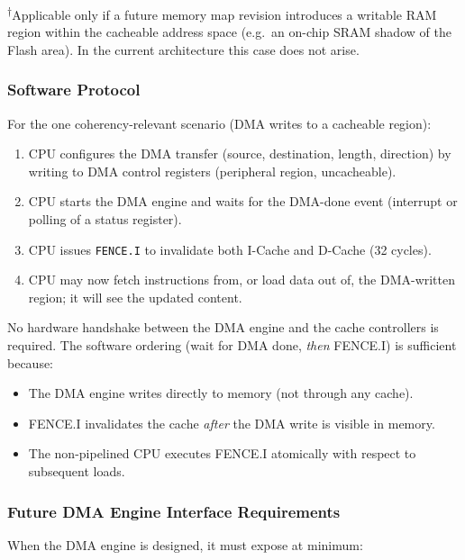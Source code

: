 \textsuperscript{$\dagger$}Applicable only if a future memory map revision
introduces a writable RAM region within the cacheable address space
(e.g.\ an on-chip SRAM shadow of the Flash area).
In the current architecture this case does not arise.

\subsubsection{Software Protocol}

For the one coherency-relevant scenario (DMA writes to a cacheable region):

\begin{enumerate}
  \item CPU configures the DMA transfer (source, destination, length,
    direction) by writing to DMA control registers (peripheral region,
    uncacheable).
  \item CPU starts the DMA engine and waits for the DMA-done event
    (interrupt or polling of a status register).
  \item CPU issues \texttt{FENCE.I} to invalidate both I-Cache and
    D-Cache (32 cycles).
  \item CPU may now fetch instructions from, or load data out of,
    the DMA-written region; it will see the updated content.
\end{enumerate}

No hardware handshake between the DMA engine and the cache controllers
is required.
The software ordering (wait for DMA done, \emph{then} FENCE.I) is
sufficient because:

\begin{itemize}
  \item The DMA engine writes directly to memory (not through any cache).
  \item FENCE.I invalidates the cache \emph{after} the DMA write is
    visible in memory.
  \item The non-pipelined CPU executes FENCE.I atomically with respect
    to subsequent loads.
\end{itemize}

\subsubsection{Future DMA Engine Interface Requirements}

When the DMA engine is designed, it must expose at minimum:

